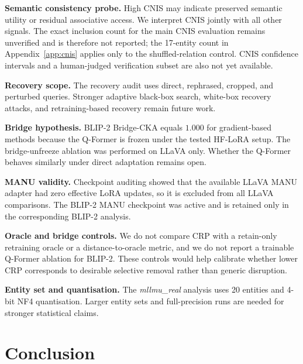 \documentclass[letterpaper]{article}
\begin{document}
\textbf{Semantic consistency probe.}
High CNIS may indicate preserved semantic utility or residual associative
access. We interpret CNIS jointly with all other signals. The exact inclusion
count for the main CNIS evaluation remains unverified and is therefore not
reported; the 17-entity count in Appendix~\ref{app:cnis} applies only to the
shuffled-relation control. CNIS confidence intervals and a human-judged
verification subset are also not yet available.

\textbf{Recovery scope.}
The recovery audit uses direct, rephrased, cropped, and perturbed queries.
Stronger adaptive black-box search, white-box recovery attacks, and
retraining-based recovery remain future work.

\textbf{Bridge hypothesis.}
BLIP-2 Bridge-CKA equals $1.000$ for gradient-based methods because the
Q-Former is frozen under the tested HF-LoRA setup. The bridge-unfreeze
ablation was performed on LLaVA only. Whether the Q-Former behaves similarly
under direct adaptation remains open.

\textbf{MANU validity.}
Checkpoint auditing showed that the available LLaVA MANU adapter had zero
effective LoRA updates, so it is excluded from all LLaVA comparisons. The
BLIP-2 MANU checkpoint was active and is retained only in the corresponding
BLIP-2 analysis.

\textbf{Oracle and bridge controls.}
We do not compare CRP with a retain-only retraining oracle or a
distance-to-oracle metric, and we do not report a trainable Q-Former ablation
for BLIP-2. These controls would help calibrate whether lower CRP corresponds
to desirable selective removal rather than generic disruption.

\textbf{Entity set and quantisation.}
The \emph{mllmu\_real} analysis uses 20 entities and 4-bit NF4 quantisation.
Larger entity sets and full-precision runs are needed for stronger
statistical claims.

\section{Conclusion}
\end{document}
